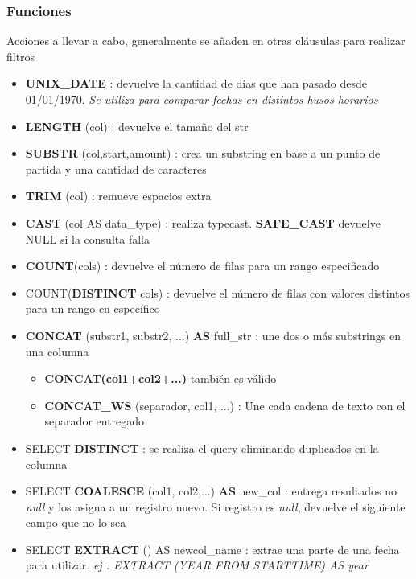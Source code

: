\subsubsection{Funciones}
Acciones a llevar a cabo, generalmente se añaden en otras cláusulas para realizar filtros
\begin{itemize}
    \item {\textbf{UNIX\_DATE} : devuelve la cantidad de días que han pasado desde 01/01/1970. \textit{Se utiliza para comparar fechas en distintos husos horarios}}
    \item {\textbf{LENGTH} (col) : devuelve el tamaño del \gls{str}}
    \item {\textbf{SUBSTR} (col,start,amount) : crea un substring en base a un punto de partida y una cantidad de caracteres}
    \item {\textbf{TRIM} (col) : remueve espacios extra}
    \item {\textbf{CAST} (col AS data\_type) : realiza \gls{typecast}. \textbf{SAFE\_CAST} devuelve NULL si la consulta falla}
    \item {\textbf{COUNT}(cols) : devuelve el número de filas para un rango especificado}
    \item {COUNT(\textbf{DISTINCT} cols) : devuelve el número de filas con valores distintos para un rango en específico}
    \item {\textbf{CONCAT} (substr1, substr2, ...) \textbf{AS} full\_str : une dos o más substrings en una columna
    \begin{itemize}
        \item {\textbf{CONCAT(col1+col2+...)} también es válido}
        \item {\textbf{CONCAT\_WS} (separador, col1, ...) : Une cada cadena de texto con el separador entregado}
    \end{itemize}}
    \item {SELECT \textbf{DISTINCT} : se realiza el query eliminando duplicados en la columna}
    \item {SELECT \textbf{COALESCE} (col1, col2,...) \textbf{AS} new\_col : entrega resultados no \textit{null} y los asigna a un registro nuevo. Si registro es \textit{null}, devuelve el siguiente campo que no lo sea}
    \item {SELECT \textbf{EXTRACT} () AS newcol\_name : extrae una parte de una fecha para utilizar. \textit{ej : EXTRACT (YEAR FROM STARTTIME) AS year} }
\end{itemize}


